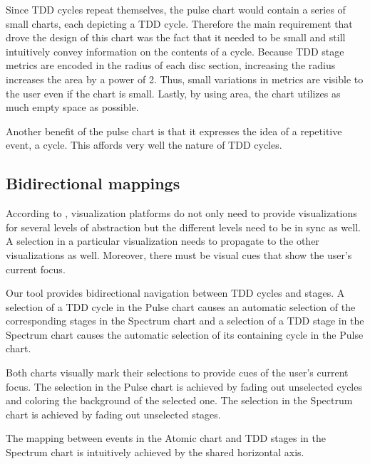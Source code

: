 \documentclass[journal]{vgtc}                %
\begin{document}
Since TDD cycles repeat themselves, the pulse chart would contain a series of small charts, each depicting a TDD cycle.
Therefore the main requirement that drove the design of this chart was the fact that it needed to be small and still intuitively convey information on the contents of a cycle.
Because TDD stage metrics are encoded in the radius of each disc section, increasing the radius increases the area by a power of 2.
Thus, small variations in metrics are visible to the user even if the chart is small.
Lastly, by using area, the chart utilizes as much empty space as possible.

Another benefit of the pulse chart is that it expresses the idea of a repetitive event, a cycle.
This affords very well the nature of TDD cycles.

\subsection{Bidirectional mappings}

According to \cite{two}, visualization platforms do not only need to provide visualizations for several levels of abstraction but the different levels need to be in sync as well.
A selection in a particular visualization needs to propagate to the other visualizations as well.
Moreover, there must be visual cues that show the user's current focus.

Our tool provides bidirectional navigation between TDD cycles and stages.
A selection of a TDD cycle in the Pulse chart causes an automatic selection of the corresponding stages in the Spectrum chart and a selection of a TDD stage in the Spectrum chart causes the automatic selection of its containing cycle in the Pulse chart.

Both charts visually mark their selections to provide cues of the user's current focus.
The selection in the Pulse chart is achieved by fading out unselected cycles and coloring the background of the selected one.
The selection in the Spectrum chart is achieved by fading out unselected stages.

The mapping between events in the Atomic chart and TDD stages in the Spectrum chart is intuitively achieved by the shared horizontal axis.
\end{document}

